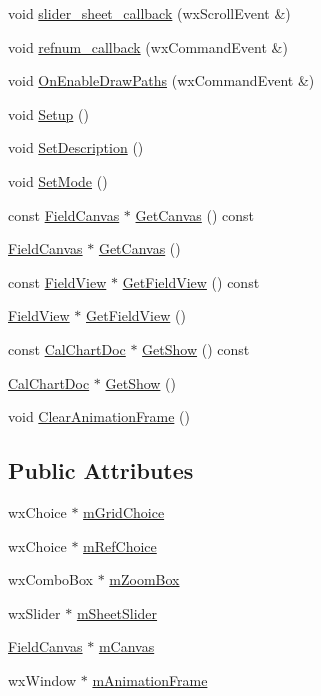 \begin{DoxyCompactItemize}
\item 
void \hyperlink{a00102_ae0aa5ad3e800f7fdc816aa90365eecce}{slider\-\_\-sheet\-\_\-callback} (wx\-Scroll\-Event \&)
\item 
void \hyperlink{a00102_a71d8201a8544227c983991e2ff357d70}{refnum\-\_\-callback} (wx\-Command\-Event \&)
\item 
void \hyperlink{a00102_ab5ad13c011a13727aa56f7291db50f3e}{On\-Enable\-Draw\-Paths} (wx\-Command\-Event \&)
\item 
void \hyperlink{a00102_a2e7359718cafd3b193fac3d278439b88}{Setup} ()
\item 
void \hyperlink{a00102_a3877a9ed85c06195cf354172f3a8186b}{Set\-Description} ()
\item 
void \hyperlink{a00102_ab6de3a54195339e7cf9d375df5f1c93f}{Set\-Mode} ()
\item 
const \hyperlink{a00101}{Field\-Canvas} $\ast$ \hyperlink{a00102_ad42b37318cbebc97366cdf32ecf43b66}{Get\-Canvas} () const 
\item 
\hyperlink{a00101}{Field\-Canvas} $\ast$ \hyperlink{a00102_ab156df0f606884f423ff9dc8dc8ecb2e}{Get\-Canvas} ()
\item 
const \hyperlink{a00103}{Field\-View} $\ast$ \hyperlink{a00102_a39554374fdfdab68fea2bce8d96b8ec0}{Get\-Field\-View} () const 
\item 
\hyperlink{a00103}{Field\-View} $\ast$ \hyperlink{a00102_aa20c10732b8a9dcf8413c4b7d364fcdd}{Get\-Field\-View} ()
\item 
const \hyperlink{a00020}{Cal\-Chart\-Doc} $\ast$ \hyperlink{a00102_a7164f330553938c27f54c4fe3a498927}{Get\-Show} () const 
\item 
\hyperlink{a00020}{Cal\-Chart\-Doc} $\ast$ \hyperlink{a00102_a11829809b1b7588db2bd6b9b73e64173}{Get\-Show} ()
\item 
void \hyperlink{a00102_a68a1eb8241e86d27ee8829f0ad5f86d1}{Clear\-Animation\-Frame} ()
\end{DoxyCompactItemize}
\subsection*{Public Attributes}
\begin{DoxyCompactItemize}
\item 
wx\-Choice $\ast$ \hyperlink{a00102_a9d711f7509d3ca3f3643b2e4b91a4078}{m\-Grid\-Choice}
\item 
wx\-Choice $\ast$ \hyperlink{a00102_ac48d3e2da0c073ddb794194ef3658c08}{m\-Ref\-Choice}
\item 
wx\-Combo\-Box $\ast$ \hyperlink{a00102_afc1d8687635d0634742edfc1289ddb2a}{m\-Zoom\-Box}
\item 
wx\-Slider $\ast$ \hyperlink{a00102_ac29f4a72ca3b9c1ecd7eab863aff0f71}{m\-Sheet\-Slider}
\item 
\hyperlink{a00101}{Field\-Canvas} $\ast$ \hyperlink{a00102_acf445173b0e0e1f281453d8ee4003061}{m\-Canvas}
\item 
wx\-Window $\ast$ \hyperlink{a00102_ab9bcb01889e459911b8b9addc79973ac}{m\-Animation\-Frame}
\end{DoxyCompactItemize}
